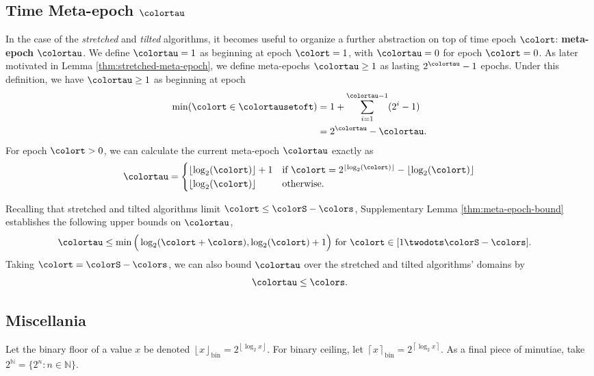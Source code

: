 \subsection{Time Meta-epoch $\colortau$}
\label{sec:notation-metaepoch}

In the case of the \textit{stretched} and \textit{tilted} algorithms, it becomes useful to organize a further abstraction on top of time epoch $\colort$: \textbf{meta-epoch} $\colortau$.
We define $\colortau=1$ as beginning at epoch $\colort = 1$, with $\colortau=0$ for epoch $\colort=0$.
As later motivated in Lemma \ref{thm:stretched-meta-epoch}, we define meta-epochs $\colortau\geq1$ as lasting $2^{\colortau} - 1$ epochs.
Under this definition, we have $\colortau\geq1$ as beginning at epoch
\begin{align}
\min(\colort \in \colortausetoft)
&= 1 + \sum_{i=1}^{\colortau - 1} (2^{i} - 1) \\
&= 2^{\colortau} - \colortau.
\label{eqn:meta-epoch-defn}
\end{align}
For epoch $\colort > 0$, we can calculate the current meta-epoch $\colortau$ exactly as
\begin{align*}
\colortau
=
\begin{cases}
\left\lfloor \log_2(\colort) \right\rfloor + 1 & \text{if } \colort = 2^{\left\lfloor \log_2(\colort) \right\rfloor} - \left\lfloor \log_2(\colort) \right\rfloor \\
\left\lfloor \log_2(\colort) \right\rfloor & \text{otherwise.}
\end{cases}
\end{align*}

Recalling that stretched and tilted algorithms limit $\colort \leq \colorS - \colors$, Supplementary Lemma \ref{thm:meta-epoch-bound} establishes the following upper bounds on $\colortau$,
\begin{align*}
\colortau
&\leq
\min\Big(
  \log_2(\colort + \colors),
  \log_2(\colort) + 1
\Big)
\text{ for } \colort \in [1 \twodots \colorS - \colors].
\end{align*}
Taking $\colort = \colorS - \colors$, we can also bound $\colortau$ over the stretched and tilted algorithms' domains by
\begin{align*}
\colortau \leq \colors.
\end{align*}

\subsection{Miscellania}

Let the binary floor of a value $x$ be denoted $\left\lfloor x \right\rfloor_\mathrm{bin} = 2^{\left\lfloor \log_2 x \right\rfloor}$.
For binary ceiling, let $\left\lceil x \right\rceil_\mathrm{bin} = 2^{\left\lceil \log_2 x \right\rceil}$.
As a final piece of minutiae, take $2^{\mathbb{N}} = \{2^n : n \in \mathbb{N} \}$.
